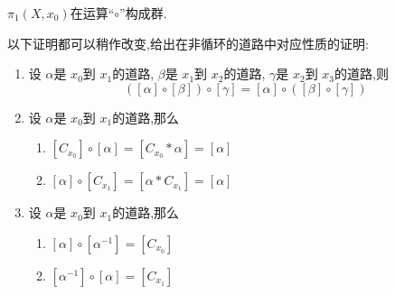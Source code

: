 \documentclass[../../几何与拓扑.tex]{subfiles}
\begin{document}
\begin{theorem}
    \(  \pi _1 \left( X,x_0 \right)   \)在运算“\(  \circ  \)”构成群.  
\end{theorem}
\begin{remark}
    以下证明都可以稍作改变,给出在非循环的道路中对应性质的证明:
    \begin{enumerate}
        \item 设 \(  \alpha   \)是 \(  x_0  \)到 \(  x_1  \)的道路, \(  \beta   \)是 \(  x_1  \)到 \(  x_2  \)的道路, \(   \gamma   \)是 \(  x_2  \)到 \(  x_3  \)的道路,则 \[
        \left( [ \alpha ]\circ [\beta ] \right)\circ [ \gamma ] =  [ \alpha ]\circ \left( [\beta ]\circ [ \gamma ] \right)  
        \]         
        \item 设 \(  \alpha   \)是 \(  x_0  \)到 \(  x_1  \)的道路,那么 
        \begin{enumerate}
            \item \(  [C_{x_0}] \circ [ \alpha ]=  [C_{x_0}* \alpha ]= [ \alpha ]  \) 
            \item \(  [ \alpha ]\circ [C_{x_1}] = [ \alpha * C_{x_1}] = [ \alpha ]\) 
        \end{enumerate}
        \item 设 \(  \alpha   \)是 \(  x_0  \)到 \(  x_1  \)的道路,那么 
        \begin{enumerate}
            \item \(  [ \alpha ]\circ [ \alpha ^{-1} ] =  [C_{x_0}]  \)
            \item \(  [ \alpha ^{-1} ]\circ [ \alpha ]=  [C_{x_1}]  \)  
        \end{enumerate}
           
    \end{enumerate}
     
\end{remark}
\end{document}
